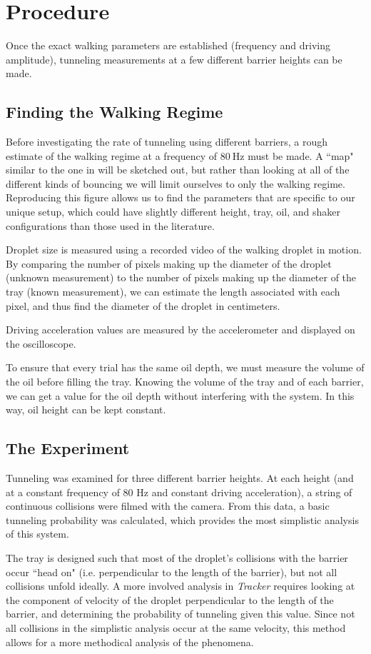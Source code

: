 \section{Procedure}
Once the exact walking parameters are established (frequency and driving amplitude), tunneling measurements at a few different barrier heights can be made. 

\subsection{Finding the Walking Regime}

Before investigating the rate of tunneling using different barriers, a rough estimate of the walking regime at a frequency of $80~\mathrm{Hz}$ must be made. A ``map" similar to the one in  will be sketched out, but rather than looking at all of the different kinds of bouncing we will limit ourselves to only the walking regime. Reproducing this figure allows us to find the parameters that are specific to our unique setup, which could have slightly different height, tray, oil, and shaker configurations than those used in the literature. 

Droplet size is measured using a recorded video of the walking droplet in motion. By comparing the number of pixels making up the diameter of the droplet (unknown measurement) to the number of pixels making up the diameter of the tray (known measurement), we can estimate the length associated with  each pixel, and thus find the diameter of the droplet in centimeters. 

Driving acceleration values are measured by the accelerometer and displayed on the oscilloscope. 

To ensure that every trial has the same oil depth, we must measure the volume of the oil before filling the tray. Knowing the volume of the tray and of each barrier, we can get a value for the oil depth without interfering with the system. In this way, oil height can be kept constant.

\subsection{The Experiment}

Tunneling was examined for three different barrier heights. At each height (and at a constant frequency of 80 Hz and constant driving acceleration), a string of continuous collisions were filmed with the camera. From this data, a basic tunneling probability was calculated, which provides the most simplistic analysis of this system. 

The tray is designed such that most of the droplet's collisions with the barrier occur ``head on" (i.e. perpendicular to the length of the barrier), but not all collisions unfold ideally. A more involved analysis in \textit{Tracker} requires looking at the component of velocity of the droplet perpendicular to the length of the barrier, and determining the probability of tunneling given this value. Since not all collisions in the simplistic analysis occur at the same velocity, this method allows for a more methodical analysis of the phenomena. 
